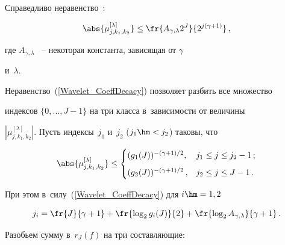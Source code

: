Справедливо неравенство~\cite{Mal99}:


\begin{equation}


\label{Wavelet_CoeffDecacy}


\abs{\mu_{j,k_1,k_2}^{[\lambda]}}\le\fr{A_{\gamma,\lambda}2^J}{2^{j(\gamma+1)}}\,,


\end{equation}


где $A_{\gamma,\lambda}$ ~-- некоторая константа, зависящая от $\gamma$ 


и~$\lambda$.





Неравенство~(\ref{Wavelet_CoeffDecacy}) позволяет разбить все множество 


индексов $\{0,\ldots,J-1\}$ на три класса в~зависимости от величины 


$|\mu_{j,k_1,k_2}^{[\lambda]}|$. Пусть индексы~$j_1$ и~$j_2$ ($j_1\hm< 


j_2$) таковы, что


$$


\abs{\mu_{j,k_1,k_2}^{[\lambda]}}\le


\begin{cases}


 (g_1(J))^{-(\gamma+1)/2}, & 


j_1\le j\le j_2-1\,;\\[6pt]


 (g_2(J))^{-(\gamma+1)/2}\,, & 


j_2\le j \le J-1\,.


\end{cases}


$$


При этом в~силу~(\ref{Wavelet_CoeffDecacy}) для $i\hm=1, 2$


\begin{equation}


\label{Indices_Soft_j2}


j_i=\fr{J}{\gamma+1}+\fr{\log_2 g_i(J)}{2}+ \fr{\log_2 


A_{\gamma,\lambda}}{\gamma+1}\,.


\end{equation}


Разобьем сумму в~$r_J(f)$ на три составляющие:



